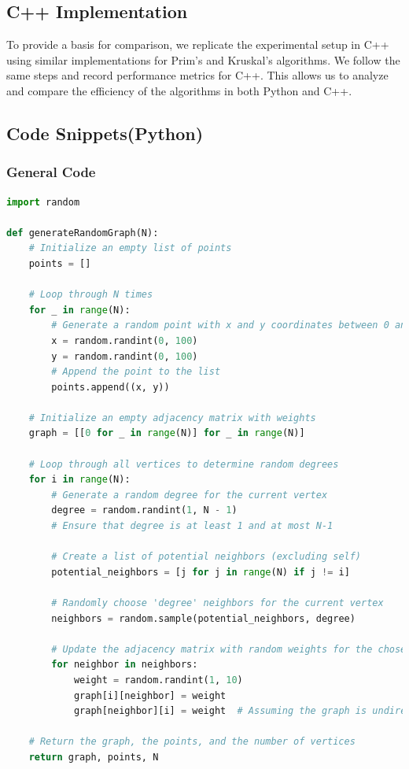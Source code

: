 \documentclass[a4paper, 10pt, twocolumn]{article}
\begin{document}
\subsection{C++ Implementation}
To provide a basis for comparison, we replicate the experimental setup in C++ using similar implementations for Prim’s and Kruskal’s algorithms. We follow the same steps and record performance metrics for C++. This allows us to analyze and compare the efficiency of the algorithms in both Python and C++.

\onecolumn
\subsection{Code Snippets(Python)}
\subsubsection{General Code}
\begin{lstlisting}[language=Python, caption={Python code to generate a random graph}]
import random

def generateRandomGraph(N):
    # Initialize an empty list of points
    points = []

    # Loop through N times
    for _ in range(N):
        # Generate a random point with x and y coordinates between 0 and 100
        x = random.randint(0, 100)
        y = random.randint(0, 100)
        # Append the point to the list
        points.append((x, y))

    # Initialize an empty adjacency matrix with weights
    graph = [[0 for _ in range(N)] for _ in range(N)]

    # Loop through all vertices to determine random degrees
    for i in range(N):
        # Generate a random degree for the current vertex
        degree = random.randint(1, N - 1)  
        # Ensure that degree is at least 1 and at most N-1

        # Create a list of potential neighbors (excluding self)
        potential_neighbors = [j for j in range(N) if j != i]

        # Randomly choose 'degree' neighbors for the current vertex
        neighbors = random.sample(potential_neighbors, degree)

        # Update the adjacency matrix with random weights for the chosen edges
        for neighbor in neighbors:
            weight = random.randint(1, 10)
            graph[i][neighbor] = weight
            graph[neighbor][i] = weight  # Assuming the graph is undirected

    # Return the graph, the points, and the number of vertices
    return graph, points, N
\end{lstlisting}
\end{document}
